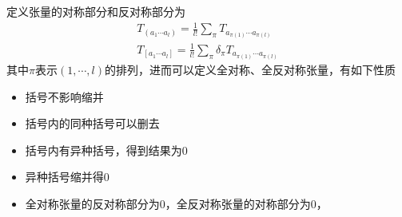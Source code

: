 定义张量的对称部分和反对称部分为
\begin{gather*}
    T_{(a_1 \cdots a_l)}=\frac{1}{l!} \displaystyle \sum_{\pi} T_{a_{\pi(1)} \cdots a_{\pi(l)}}
    \\
    T_{[a_1 \cdots a_l]}=\frac{1}{l!} \displaystyle \sum_{\pi} \delta_{\pi} T_{a_{\pi(1)} \cdots a_{\pi(l)}}
\end{gather*}
其中$\pi$表示$(1,\cdots,l)$的排列，进而可以定义全对称、全反对称张量，有如下性质
\begin{itemize}
    \item 括号不影响缩并
    \item 括号内的同种括号可以删去
    \item 括号内有异种括号，得到结果为$0$
    \item 异种括号缩并得$0$
    \item 全对称张量的反对称部分为$0$，全反对称张量的对称部分为$0$，
\end{itemize}